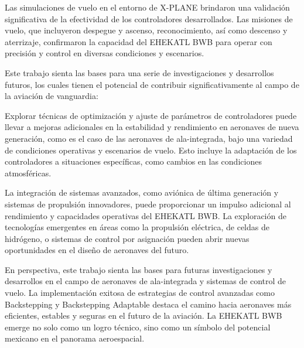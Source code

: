 Las simulaciones de vuelo en el entorno de X-PLANE brindaron una validación significativa de la efectividad de los controladores desarrollados. Las misiones de vuelo, que incluyeron despegue y ascenso, reconocimiento, así como descenso y aterrizaje, confirmaron la capacidad del EHEKATL BWB para operar con precisión y control en diversas condiciones y escenarios.



Este trabajo sienta las bases para una serie de investigaciones y desarrollos futuros, los cuales tienen el potencial de contribuir significativamente al campo de la aviación de vanguardia:

Explorar técnicas de optimización y ajuste de parámetros de controladores puede llevar a mejoras adicionales en la estabilidad y rendimiento en aeronaves de nueva generación, como es el caso de las aeronaves de ala-integrada, bajo una variedad de condiciones operativas y escenarios de vuelo. Esto incluye la adaptación de los controladores a situaciones específicas, como cambios en las condiciones atmosféricas.

La integración de sistemas avanzados, como aviónica de última generación y sistemas de propulsión innovadores, puede proporcionar un impulso adicional al rendimiento y capacidades operativas del EHEKATL BWB. La exploración de tecnologías emergentes en áreas como la propulsión eléctrica, de celdas de hidrógeno, o sistemas de control por asignación pueden abrir nuevas oportunidades en el diseño de aeronaves del futuro.

En perspectiva, este trabajo sienta las bases para futuras investigaciones y desarrollos en el campo de aeronaves de ala-integrada y sistemas de control de vuelo. La implementación exitosa de estrategias de control avanzadas como Backstepping y Backstepping Adaptable destaca el camino hacia aeronaves más eficientes, estables y seguras en el futuro de la aviación. La EHEKATL BWB emerge no solo como un logro técnico, sino como un símbolo del potencial mexicano en el panorama aeroespacial.



